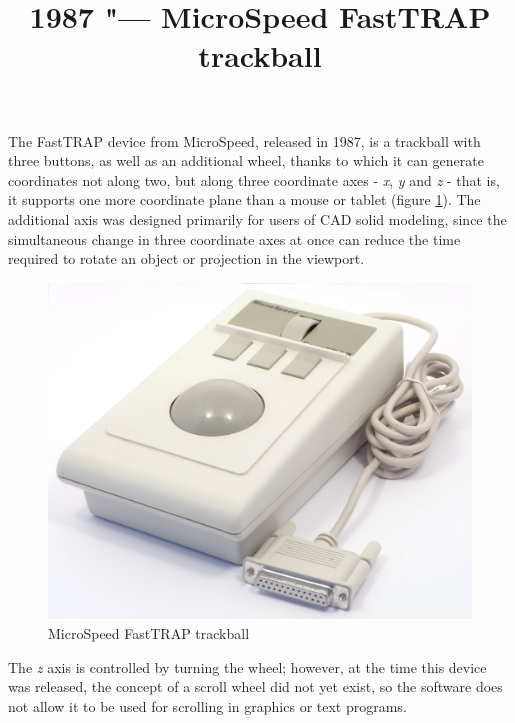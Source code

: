 \documentclass[11pt, a4paper]{article}
\begin{document}
\title{1987 "--- MicroSpeed FastTRAP trackball}
\date{}
\maketitle
{}
The FastTRAP device from MicroSpeed, released in 1987, is a trackball with three buttons, as well as an additional wheel, thanks to which it can generate coordinates not along two, but along three coordinate axes - \textit{x}, \textit{y} and \textit{z} - that is, it supports one more coordinate plane than a mouse or tablet (figure \ref{fig:FastTRAPPic}). The additional axis was designed primarily for users of CAD solid modeling, since the simultaneous change in three coordinate axes at once can reduce the time required to rotate an object or projection in the viewport.

\begin{figure}[h]
   \centering
    \includegraphics[scale=0.3]{1987_microspeed_fasttrap/pic_15.jpg}
    \caption{MicroSpeed FastTRAP trackball}
    \label{fig:FastTRAPPic}
\end{figure}

The \textit{z} axis is controlled by turning the wheel; however, at the time this device was released, the concept of a scroll wheel did not yet exist, so the software does not allow it to be used for scrolling in graphics or text programs.
\end{document}
